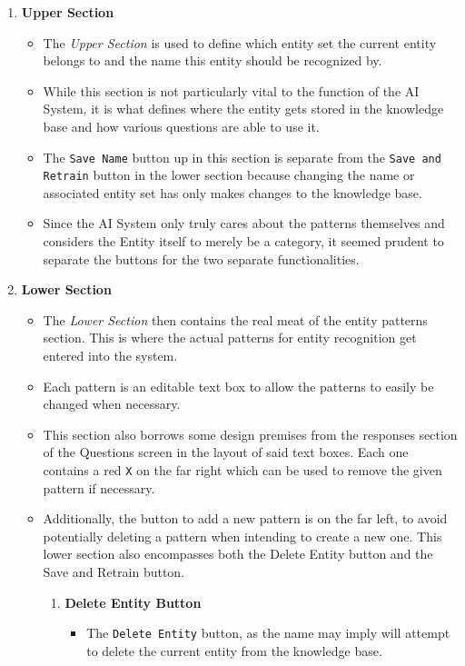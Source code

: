 \documentclass[titlepage, 12pt]{article}
\begin{document}
\begin{enumerate}
    \item \textbf{Upper Section}
    \begin{itemize}
        \item The \emph{Upper Section} is used to define which entity set the current entity belongs to and the name this entity should be recognized by.
        \item While this section is not particularly vital to the function of the AI System, it is what defines where the entity gets stored in the knowledge base and how various questions are able to use it.
        \item The \texttt{Save Name} button up in this section is separate from the \texttt{Save and Retrain} button in the lower section because changing the name or associated entity set has only makes changes to the knowledge base.
        \item Since the AI System only truly cares about the patterns themselves and considers the Entity itself to merely be a category, it seemed prudent to separate the buttons for the two separate functionalities.
    \end{itemize}
    \item \textbf{Lower Section}
    \begin{itemize}
        \item The \emph{Lower Section} then contains the real meat of the entity patterns section. This is where the actual patterns for entity recognition get entered into the system.
        \item Each pattern is an editable text box to allow the patterns to easily be changed when necessary.
        \item This section also borrows some design premises from the responses section of the Questions screen in the layout of said text boxes. Each one contains a red \texttt{X} on the far right which can be used to remove the given pattern if necessary.
        \item Additionally, the button to add a new pattern is on the far left, to avoid potentially deleting a pattern when intending to create a new one. This lower section also encompasses both the Delete Entity button and the Save and Retrain button.
        \begin{enumerate}
            \item \textbf{Delete Entity Button}
            \begin{itemize}
                \item The \texttt{Delete Entity} button, as the name may imply will attempt to delete the current entity from the knowledge base.

\end{itemize}
\end{enumerate}
\end{itemize}
\end{enumerate}
\end{document}
